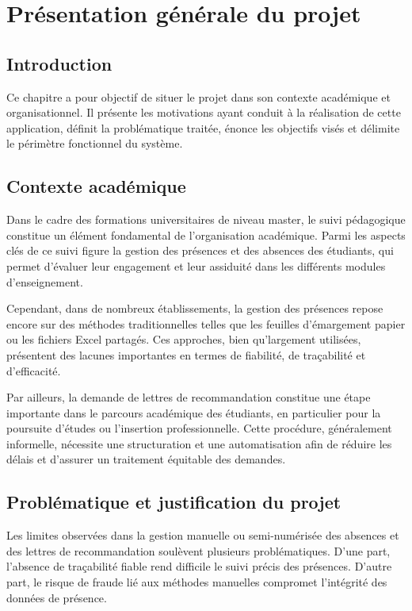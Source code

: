 \documentclass[12pt, a4paper, openright]{report}
\begin{document}
\cleardoublepage
\chapter{Présentation générale du projet}
\thispagestyle{fancy}

\section{Introduction}

Ce chapitre a pour objectif de situer le projet dans son contexte académique et organisationnel. Il présente les motivations ayant conduit à la réalisation de cette application, définit la problématique traitée, énonce les objectifs visés et délimite le périmètre fonctionnel du système.

\section{Contexte académique}

Dans le cadre des formations universitaires de niveau master, le suivi pédagogique constitue un élément fondamental de l'organisation académique. Parmi les aspects clés de ce suivi figure la gestion des présences et des absences des étudiants, qui permet d'évaluer leur engagement et leur assiduité dans les différents modules d'enseignement.

Cependant, dans de nombreux établissements, la gestion des présences repose encore sur des méthodes traditionnelles telles que les feuilles d'émargement papier ou les fichiers Excel partagés. Ces approches, bien qu'largement utilisées, présentent des lacunes importantes en termes de fiabilité, de traçabilité et d'efficacité.

Par ailleurs, la demande de lettres de recommandation constitue une étape importante dans le parcours académique des étudiants, en particulier pour la poursuite d'études ou l'insertion professionnelle. Cette procédure, généralement informelle, nécessite une structuration et une automatisation afin de réduire les délais et d'assurer un traitement équitable des demandes.

\section{Problématique et justification du projet}

Les limites observées dans la gestion manuelle ou semi-numérisée des absences et des lettres de recommandation soulèvent plusieurs problématiques. D'une part, l'absence de traçabilité fiable rend difficile le suivi précis des présences. D'autre part, le risque de fraude lié aux méthodes manuelles compromet l'intégrité des données de présence.
\end{document}
